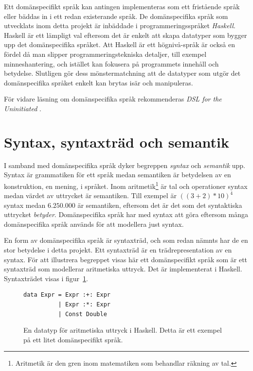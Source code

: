 \begin{draft}
Ett domänspecifikt språk kan antingen implementeras som ett fristående språk
eller bäddas in i ett redan existerande språk. De domänspecifika språk som
utvecklats inom detta projekt är inbäddade i programmeringsspråket
\textit{Haskell}. Haskell är ett lämpligt val eftersom det är enkelt att skapa
datatyper som bygger upp det domänspecifika språket. Att Haskell är ett
högnivå-språk är också en fördel då man slipper programmeringstekniska detaljer,
till exempel minneshantering, och istället kan fokusera på programmets innehåll
och betydelse. Slutligen gör dess mönstermatchning att de datatyper som utgör
det domänspecifika språket enkelt kan brytas isär och manipuleras.

För vidare läsning om domänspecifika språk rekommenderas \textit{DSL for the Uninitiated} \cite{DSLU}. 

\section{Syntax, syntaxträd och semantik}\label{sec:syntax}

I samband med domänspecifika språk dyker begreppen \textit{syntax} och
\textit{semantik} upp. Syntax är grammatiken för ett språk medan semantiken är
betydelsen av en konstruktion, en mening, i språket. Inom
aritmetik\footnote{Aritmetik är den gren inom matematiken som behandlar
räkning av tal.} är tal och operationer syntax medan värdet av uttrycket är semantiken.
Till exempel är $((3 + 2) * 10)^4$ syntax medan $6.250.000$ är semantiken,
eftersom det är det som det syntaktiska uttrycket \textit{betyder}.
Domänspecifika språk har med syntax att göra eftersom många domänspecifika språk
används för att modellera just syntax.

En form av domänspecifika språk är syntaxträd, och som redan nämnts har de en stor
betydelse i detta projekt. Ett syntaxträd är en trädrepresentation av en syntax.
För att illustrera begreppet visas här ett domänspecifikt språk som är ett
syntaxträd som modellerar aritmetiska uttryck. Det är implementerat i Haskell.
Syntaxträdet visas i figur~\ref{fig:syntax_exempel}.

\begin{figure}[tph]
  \begin{lstlisting}
data Expr = Expr :+: Expr
          | Expr :*: Expr
          | Const Double
  \end{lstlisting}
  \caption{En datatyp för aritmetiska uttryck i Haskell. Detta är ett exempel på
           ett litet domänspecifikt språk.}\label{fig:syntax_exempel} 
\end{figure}


\end{draft}
